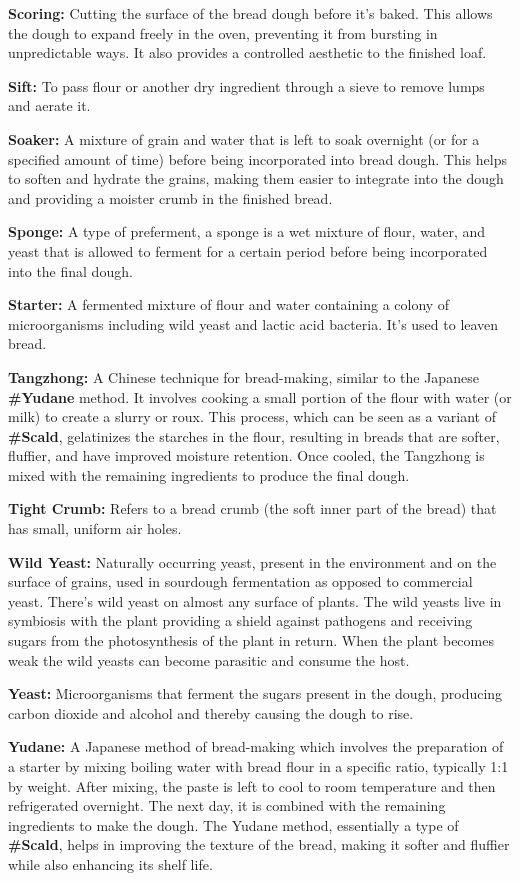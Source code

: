 \textbf{Scoring:} Cutting the surface of the bread dough before it's baked. This
allows the dough to expand freely in the oven, preventing it from bursting in
unpredictable ways. It also provides a controlled aesthetic to the finished loaf.

\textbf{Sift:} To pass flour or another dry ingredient through a sieve to remove lumps
and aerate it.

\textbf{Soaker:} A mixture of grain and water that is left to soak overnight (or for a
specified amount of time) before being incorporated into bread dough. This helps to
soften and hydrate the grains, making them easier to integrate into the dough and
providing a moister crumb in the finished bread.

\textbf{Sponge:} A type of preferment, a sponge is a wet mixture of flour, water, and
yeast that is allowed to ferment for a certain period before being incorporated into
the final dough.

\textbf{Starter:} A fermented mixture of flour and water containing a colony of
microorganisms including wild yeast and lactic acid bacteria. It's used to leaven
bread.

\textbf{Tangzhong:} A Chinese technique for bread-making, similar to the
Japanese \textbf{\#Yudane} method. It involves cooking a small portion of the flour
with water (or milk) to create a slurry or roux. This process, which can be seen as a
variant of \textbf{\#Scald}, gelatinizes the starches in the flour, resulting in breads
that are softer, fluffier, and have improved moisture retention. Once cooled, the
Tangzhong is mixed with the remaining ingredients to produce the final dough.

\textbf{Tight Crumb:} Refers to a bread crumb (the soft inner part of the bread) that
has small, uniform air holes.

\textbf{Wild Yeast:} Naturally occurring yeast, present in the environment and on the
surface of grains, used in sourdough fermentation as opposed to commercial yeast.
There’s wild yeast on almost any surface of plants. The wild yeasts live in symbiosis
with the plant providing a shield against pathogens and receiving sugars from the
photosynthesis of the plant in return. When the plant becomes weak the wild yeasts
can become parasitic and consume the host.

\textbf{Yeast:} Microorganisms that ferment the sugars present in the dough, producing
carbon dioxide and alcohol and thereby causing the dough to rise.

\textbf{Yudane:} A Japanese method of bread-making which involves the preparation
of a starter by mixing boiling water with bread flour in a specific ratio, typically 1:1
by weight. After mixing, the paste is left to cool to room temperature and then
refrigerated overnight. The next day, it is combined with the remaining ingredients
to make the dough. The Yudane method, essentially a type of \textbf{\#Scald}, helps in
improving the texture of the bread, making it softer and fluffier while also enhancing
its shelf life.
